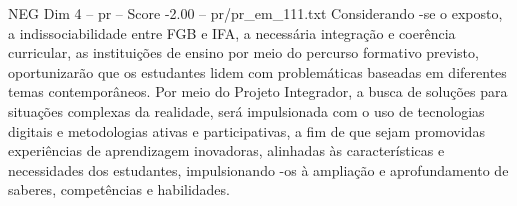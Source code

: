 \begin{textsample}{NEG Dim 4 – pr – Score -2.00 – pr/pr\_em\_111.txt}
Considerando -se o exposto, a indissociabilidade entre FGB e IFA, a necessária integração e coerência curricular, as instituições de ensino por meio do percurso formativo previsto, oportunizarão que os estudantes lidem com problemáticas baseadas em diferentes temas contemporâneos.
Por meio do Projeto Integrador, a busca de soluções para situações complexas da realidade, será impulsionada com o uso de tecnologias digitais e metodologias ativas e participativas, a fim de que sejam promovidas experiências de aprendizagem inovadoras, alinhadas às características e necessidades dos estudantes, impulsionando -os à ampliação e aprofundamento de saberes, competências e habilidades.

\end{textsample}
